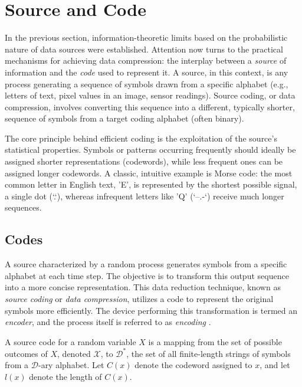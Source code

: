 \section{Source and Code} \label{sec:source_and_codes}

\noindent In the previous section, information-theoretic limits based on the probabilistic nature of data sources were established. Attention now turns to the practical mechanisms for achieving data compression: the interplay between a \emph{source} of information and the \emph{code} used to represent it. A source, in this context, is any process generating a sequence of symbols drawn from a specific alphabet (e.g., letters of text, pixel values in an image, sensor readings). Source coding, or data compression, involves converting this sequence into a different, typically shorter, sequence of symbols from a target coding alphabet (often binary).

\noindent The core principle behind efficient coding is the exploitation of the source's statistical properties. Symbols or patterns occurring frequently should ideally be assigned shorter representations (codewords), while less frequent ones can be assigned longer codewords. A classic, intuitive example is Morse code: the most common letter in English text, 'E', is represented by the shortest possible signal, a single dot (`.`), whereas infrequent letters like 'Q' (`--.-`) receive much longer sequences.

\subsection{Codes}

A source characterized by a random process generates symbols from a specific alphabet at each time step. The objective is to transform this output sequence into a more concise representation. This data reduction technique, known as \emph{source coding} or \emph{data compression}, utilizes a code to represent the original symbols more efficiently. The device performing this transformation is termed an \emph{encoder}, and the process itself is referred to as \emph{encoding} \cite{han2002mathematics}.

\begin{definition}\label{def:code}
    A source code for a random variable $X$ is a mapping from the set of possible outcomes of $X$, denoted $\mathcal{X}$, to $\mathcal{D}^*$, the set of all finite-length strings of symbols from a $\mathcal{D}$-ary alphabet. Let $C(x)$ denote the codeword assigned to $x$, and let $l(x)$ denote the length of $C(x)$.
\end{definition}

